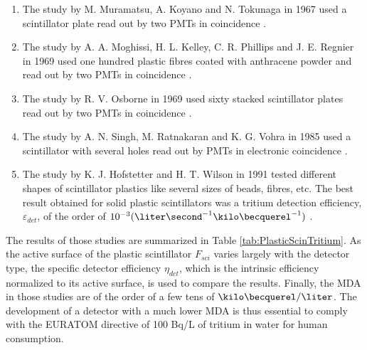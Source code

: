 \begin{enumerate}

\item{} The study by M. Muramatsu, A. Koyano and N. Tokunaga in 1967 used a scintillator plate read out by two PMTs in coincidence \cite{Muramatsu}.

\item{} The study by A. A. Moghissi, H. L. Kelley, C. R. Phillips and J. E. Regnier in 1969 used one hundred plastic fibres coated with anthracene powder and read out by two PMTs in coincidence \cite{Moghissi}.

\item{} The study by R. V. Osborne in 1969 used sixty stacked scintillator plates read out by two PMTs in coincidence \cite{Osborne}.

\item{} The study by A. N. Singh, M. Ratnakaran and K. G. Vohra in 1985 used a scintillator with several holes read out by PMTs in electronic coincidence \cite{Ratnakaran, Ratnakaran2000}.

\item{} The study by K. J. Hofstetter and H. T. Wilson in 1991 tested different shapes of scintillator plastics like several sizes of beads, fibres, etc. The best result obtained for solid plastic scintillators was a tritium detection efficiency, $\varepsilon_{det}$, of the order of $10^{-3}(\liter\second^{-1}\kilo\becquerel^{-1})$ \cite{Hofstetter1, Hofstetter2}.

\end{enumerate}

The results of those studies are summarized in Table \ref{tab:PlasticScinTritium}. As the active surface of the plastic scintillator $F_{sci}$ varies largely with the detector type, the specific detector efficiency $\eta_{det}$, which is the intrinsic efficiency normalized to its active surface, is used to compare the results. Finally, the MDA in those studies are of the order of a few tens of $\kilo\becquerel/\liter$. The development of a detector with a much lower MDA is thus essential to comply with the EURATOM directive of 100 Bq/L of tritium in water for human consumption.

